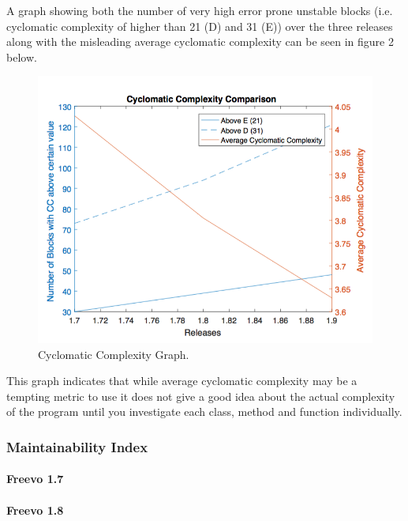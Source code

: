 \documentclass[10.5pt,journal, a4paper]{IEEEtran}
\begin{document}
\noindent
A graph showing  both the number of very high error prone unstable blocks (i.e. cyclomatic complexity of higher than 21 (D) and 31 (E)) over the three releases along with the misleading average cyclomatic complexity can be seen in figure 2 below.



 \begin{figure}[H]
 \centering 
 \includegraphics[width=\columnwidth]{CCcomp}
 \centering 
  \caption {Cyclomatic Complexity Graph. }
 \end{figure}

\noindent
 This graph indicates that while average cyclomatic complexity may be a tempting metric to use it does not give a good idea about the actual complexity of the program until you investigate each class, method and function individually. 




\subsubsection{Maintainability Index}

\paragraph{Freevo 1.7}


\paragraph{Freevo 1.8}
\end{document}
